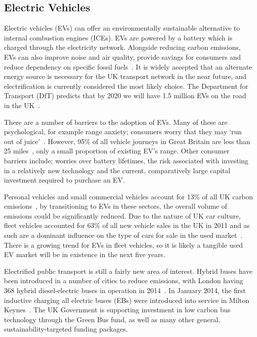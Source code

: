 \documentclass[conference]{IEEEtran}
\begin{document}
\subsection{Electric Vehicles}

Electric vehicles (EVs) can offer an environmentally sustainable
alternative to internal combustion engines (ICEs). EVs are powered by
a battery which is charged through the electricity network. Alongside
reducing carbon emissions, EVs can also improve noise and air quality,
provide savings for consumers and reduce dependency on specific fossil
fuels~\cite{postevs:2010}. It is widely accepted that an alternate
energy source is necessary for the UK transport network in the near
future, and electrification is currently considered the most likely
choice.  The Department for Transport (DfT) predicts that by 2020 we
will have 1.5 million EVs on the road in the UK~\cite{dft:2008}.

There are a number of barriers to the adoption of EVs. Many of these
are psychological, for example range anxiety; consumers worry that
they may `run out of juice'~\cite{oflev:2011}. However, 95\% of all
vehicle journeys in Great Britain are less than 25
miles~\cite{oflev:2011}, only a small proportion of existing EV's
range. Other consumer barriers include; worries over battery
lifetimes, the risk associated with investing in a relatively new
technology and the current, comparatively large capital investment
required to purchase an EV.

Personal vehicles and small commercial vehicles account for 13\% of
all UK carbon emissions~\cite{lumsden:2012}, by transitioning to EVs
in these sectors, the overall volume of emissions could be
significantly reduced.  Due to the nature of UK car culture, fleet
vehicles accounted for 63\% of all new vehicle sales in the UK in 2011
and as such are a dominant influence on the type of cars for sale in
the used market~\cite{fleets:2012}. There is a growing trend for EVs
in fleet vehicles, so it is likely a tangible used EV market will be
in existence in the next five years.

Electrified public transport is still a fairly new area of
interest. Hybrid buses have been introduced in a number of cities to
reduce emissions, with London having 368 hybrid diesel-electric buses
in operation in 2014~\cite{tfl:2009}. In January 2014, the first
inductive charging all electric buses (EBs) were introduced into
service in Milton Keynes~\cite{bbcnews:2014}. The UK Government is
supporting investment in low carbon bus technology through the Green
Bus fund, as well as many other general, sustainability-targeted
funding packages.
\end{document}
